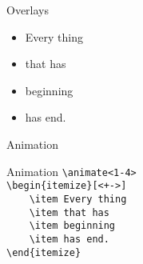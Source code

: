 \begin{frame}{Overlays}
    \begin{itemize}[<+->]
        \item Every thing
        \item that has
        \item beginning
        \item has end.
    \end{itemize}
\end{frame}

\begin{frame}{Animation}
\magicPage
    \begin{itemize}
    \end{itemize}\vspace{5mm}
\end{frame}

\begin{frame}[fragile]{Animation}
    \lstinline[basicstyle=\tt]|\animate<1-4>| \\
    \lstinline[basicstyle=\tt]|\begin{itemize}[<+->]| \\
    \lstinline[basicstyle=\tt]|    \item Every thing|   \\
    \lstinline[basicstyle=\tt]|    \item that has|   \\
    \lstinline[basicstyle=\tt]|    \item beginning| \\
    \lstinline[basicstyle=\tt]|    \item has end.|   \\
    \lstinline[basicstyle=\tt]|\end{itemize}|
\end{frame}

